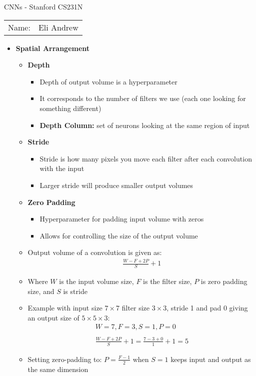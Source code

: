 \documentclass[12pt]{article}
\begin{document}
\begin{center}
{\Large CNNs - Stanford CS231N}

\begin{tabular}{rl}
Name: & Eli Andrew
\end{tabular}
\end{center}

  \begin{itemize}
    \item \textbf{Spatial Arrangement}
    \begin{itemize}
        \item \textbf{Depth}
        \begin{itemize}
            \item Depth of output volume is a hyperparameter
            \item It corresponds to the number of filters we use (each one looking for something different)
            \item \textbf{Depth Column:} set of neurons looking at the same region of input
        \end{itemize}
        \item \textbf{Stride}
        \begin{itemize}
            \item Stride is how many pixels you move each filter after each convolution with the input
            \item Larger stride will produce smaller output volumes
        \end{itemize}
        \item \textbf{Zero Padding}
        \begin{itemize}
            \item Hyperparameter for padding input volume with zeros
            \item Allows for controlling the size of the output volume
        \end{itemize}
        \item Output volume of a convolution is given as:
        \begin{gather*}
            \frac{W - F + 2P}{S} + 1
        \end{gather*}
        \item Where $W$ is the input volume size, $F$ is the filter size, $P$ is zero padding size, and $S$ is stride
        \item Example with input size $7\times7$ filter size $3\times3$, stride 1 and pad 0 giving an output size of $5\times5\times3$:
        \begin{gather*}
            W = 7, F = 3, S = 1, P = 0 \\ \\
            \frac{W - F + 2P}{S} + 1 = \frac{7 - 3 + 0}{1} + 1 = 5
        \end{gather*}
        \item Setting zero-padding to: $P = \frac{F-1}{2}$ when $S = 1$ keeps input and output as the same dimension
    \end{itemize}
  \end{itemize}
\end{document}
